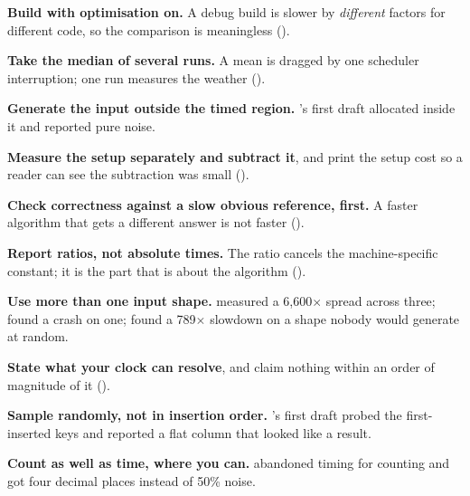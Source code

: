 \begin{conceptbox}
\begin{tightnum}
  \item \textbf{Build with optimisation on.} A debug build is slower by
        \emph{different} factors for different code, so the comparison is
        meaningless ().
  \item \textbf{Take the median of several runs.} A mean is dragged by one
        scheduler interruption; one run measures the weather ().
  \item \textbf{Generate the input outside the timed region.} 's
        first draft allocated inside it and reported pure noise.
  \item \textbf{Measure the setup separately and subtract it}, and print the
        setup cost so a reader can see the subtraction was small
        ().
  \item \textbf{Check correctness against a slow obvious reference, first.} A
        faster algorithm that gets a different answer is not faster
        ().
  \item \textbf{Report ratios, not absolute times.} The ratio cancels the
        machine-specific constant; it is the part that is about the algorithm
        ().
  \item \textbf{Use more than one input shape.}  measured a
        6{,}600$\times$ spread across three;  found a crash on
        one;  found a 789$\times$ slowdown on a shape
        nobody would generate at random.
  \item \textbf{State what your clock can resolve}, and claim nothing within an
        order of magnitude of it ().
  \item \textbf{Sample randomly, not in insertion order.} 's
        first draft probed the first-inserted keys and reported a flat column
        that looked like a result.
  \item \textbf{Count as well as time, where you can.}  abandoned
        timing for counting and got four decimal places instead of 50\% noise.
\end{tightnum}
\end{conceptbox}

